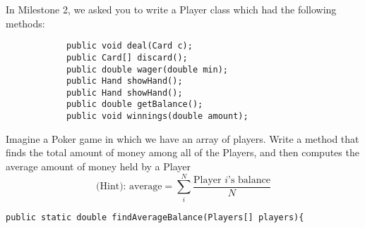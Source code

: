 \documentclass[answers]{exam}
\begin{document}
\begin{questions}
    
	\pagebreak    
    
	\question In Milestone 2, we asked you to write a Player class which had the following methods: \\
		\begin{lstlisting}
			public void deal(Card c);
			public Card[] discard();
			public double wager(double min);
			public Hand showHand();
			public Hand showHand();
			public double getBalance();
			public void winnings(double amount);
		\end{lstlisting}
		
		Imagine a Poker game in which we have an array of players. Write a method that finds the total amount of money among all of the Players, and then computes the average amount of money held by a Player $$\text{(Hint): average} = \sum^N_i{\frac{\text{Player $i$'s balance}}{N}}$$
		\begin{lstlisting}
public static double findAverageBalance(Players[] players){
			

\end{lstlisting}
\end{questions}
\end{document}
